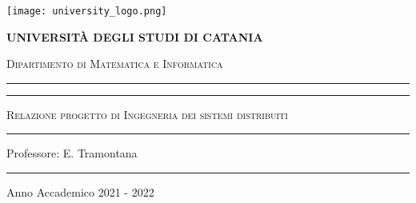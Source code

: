 \begin{titlepage}
    \centering
    \texttt{[image: university\_logo.png]}

    \bigskip

    {\Large \textbf{UNIVERSITÀ DEGLI STUDI DI CATANIA}}

    {\scshape
        \large
        Dipartimento di Matematica e Informatica
    }

    \bigskip

    \hrule

    \bigskip
    \bigskip
    \bigskip
    \bigskip

    {\itshape
        \large
        \@author
        \par}

    \bigskip
    \bigskip
    \bigskip
    \bigskip

    {\centering
        \Large
        \@title
        \par}
    \vspace{5mm}
    \bigskip
    \bigskip
    \bigskip
    \bigskip
    \bigskip
    \bigskip

    \begin{minipage}[b]{8 cm}
        \hrule
        \bigskip
        {\centering\scshape
            Relazione progetto di Ingegneria dei sistemi distribuiti
            \par}
        \bigskip
        \hrule
    \end{minipage}

    \bigskip
    \bigskip
    \bigskip
    \bigskip
    \bigskip
    \bigskip
    \bigskip
    \bigskip
    \bigskip
    \bigskip
    \bigskip

    {\raggedleft
        Professore: E. Tramontana
        \par}

    \bigskip
    \bigskip
    \bigskip
    \bigskip

    \vfill

    \hrule

    \bigskip

    {\centering
        Anno Accademico 2021 - 2022
        \par}

\end{titlepage}